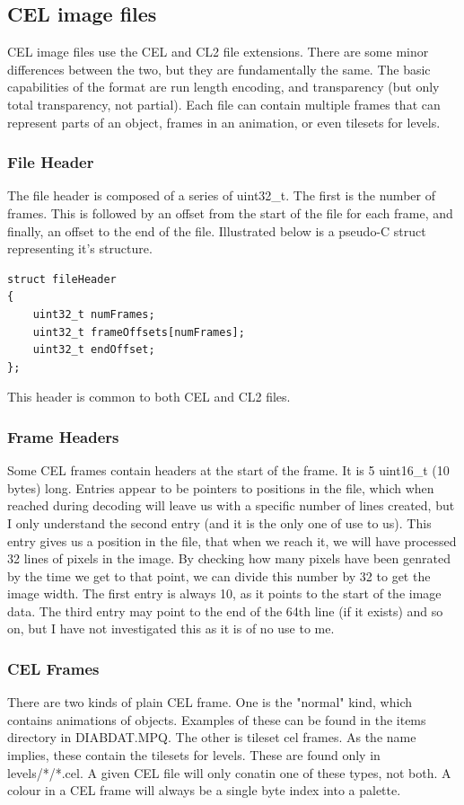 \documentclass[a4paper]{article}
\begin{document}
\subsection{CEL image files}
	CEL image files use the CEL and CL2 file extensions. There are some minor differences between the two, but they are fundamentally the same. The basic capabilities of the format are run length encoding, and transparency (but only total transparency, not partial). Each file can contain multiple frames that can represent parts of an object, frames in an animation, or even tilesets for levels.

	\subsubsection{File Header}
	\label{sec:fileheaders}
	The file header is composed of a series of uint32\_t. The first is the number of frames. This is followed by an offset from the start of the file for each frame, and finally, an offset to the end of the file. Illustrated below is a pseudo-C struct representing it's structure.
	\begin{lstlisting}
struct fileHeader
{
	uint32_t numFrames;
	uint32_t frameOffsets[numFrames];
	uint32_t endOffset;
};
	\end{lstlisting}
	 This header is common to both CEL and CL2 files.
	 
	\subsubsection{Frame Headers}
	\label{sec:frameheaders}
	Some CEL frames contain headers at the start of the frame. It is 5 uint16\_t (10 bytes) long. Entries appear to be pointers to positions in the file, which when reached during decoding will leave us with a specific number of lines created, but I only understand the second entry (and it is the only one of use to us). This entry gives us a position in the file, that when we reach it, we will have processed 32 lines of pixels in the image. By checking how many pixels have been genrated by the time we get to that point, we can divide this number by 32 to get the image width.
	The first entry is always 10, as it points to the start of the image data.
	The third entry may point to the end of the 64th line (if it exists) and so on, but I have not investigated this as it is of no use to me.
	
	\subsubsection{CEL Frames}
	There are two kinds of plain CEL frame. One is the "normal" kind, which contains animations of objects. Examples of these can be found in the items directory in DIABDAT.MPQ. The other is tileset cel frames. As the name implies, these contain the tilesets for levels. These are found only in levels/*/*.cel.
	A given CEL file will only conatin one of these types, not both.
A colour in a CEL frame will always be a single byte index into a palette.
\end{document}
